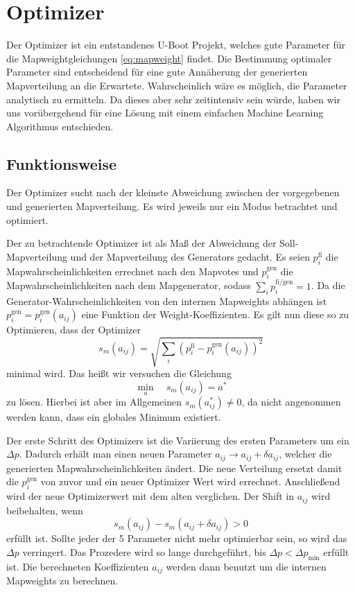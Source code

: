 \section{Optimizer}
\label{sub:optimizer}
Der Optimizer ist ein entstandenes U-Boot Projekt, welches gute Parameter für die Mapweightgleichungen \ref{eq:mapweight} findet.
Die Bestimmung optimaler Parameter sind entscheidend für eine gute Annäherung der generierten Mapverteilung an die Erwartete.
Wahrscheinlich wäre es möglich, die Parameter analytisch zu ermitteln. Da dieses aber sehr zeitintensiv sein würde, 
haben wir uns vorübergehend für eine Lösung mit einem einfachen \glqq{}Machine Learning\grqq{} Algorithmus entschieden. 
\subsection{Funktionsweise}
Der Optimizer sucht nach der kleinste Abweichung zwischen der vorgegebenen und generierten Mapverteilung. 
Es wird jeweils nur ein Modus betrachtet und optimiert.

Der zu betrachtende Optimizer ist als Maß der Abweichung der \glqq{}Soll-Mapverteilung\grqq{} und der Mapverteilung des Generators gedacht. 
Es seien $p_i^\text{fi}$ die Mapwahrscheinlichkeiten errechnet nach den Mapvotes und $p_i^\text{gen}$ die Mapwahrscheinlichkeiten nach dem Mapgenerator, sodass $\sum_i p_i^\text{fi/gen}=1$.
Da die Generator-Wahrscheinlichkeiten von den internen Mapweights abhängen ist $p_i^\text{gen}=p_i^\text{gen}(a_{ij})$ eine Funktion der Weight-Koeffizienten. 
Es gilt nun diese so zu Optimieren, dass der Optimizer 
\begin{equation}
    s_m(a_{ij}) = \sqrt{\sum_i \left(p_i^\text{fi}-p_i^\text{gen}(a_{ij})\right)^2}
\end{equation}
minimal wird. 
Das heißt wir versuchen die Gleichung 
\begin{equation}
    \underset{a}{\min}\quad s_m(a_{ij}) = a^*
\end{equation}
zu lösen. 
Hierbei ist aber im Allgemeinen $s_m(a^*_{ij}) \neq 0$, da nicht angenommen werden kann, dass ein globales Minimum existiert. 

Der erste Schritt des Optimizers ist die Variierung des ersten Parameters um ein $\varDelta p$.
Dadurch erhält man einen neuen Parameter $a_{ij} \rightarrow a_{ij} + \delta a_{ij}$, welcher die generierten Mapwahrscheinlichkeiten ändert.
Die neue Verteilung ersetzt damit die $p_i^\text{gen}$ von zuvor und ein neuer Optimizer Wert wird errechnet. 
Anschließend wird der neue Optimizerwert mit dem alten verglichen. 
Der Shift in $a_{ij}$ wird beibehalten, wenn 
\begin{equation}
    s_m(a_{ij}) - s_m(a_{ij}+\delta a_{ij}) > 0 
\end{equation}
erfüllt ist. 
Sollte jeder der 5 Parameter nicht mehr optimierbar sein, so wird das $\varDelta p$ verringert.
Das Prozedere wird so lange durchgeführt, bis $\varDelta p < \varDelta p_\text{min}$ erfüllt ist. 
Die berechneten Koeffizienten $a_{ij}$ werden dann benutzt um die internen Mapweights zu berechnen.
